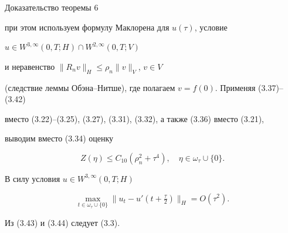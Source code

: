 \begin{pf*}{Доказательство теоремы 6}
\begin{equation}
\end{equation}


при этом используем формулу Маклорена для $u(\tau)$, условие


$u\in W^{3,\infty}(0,T;H)\cap W^{2,\infty}(0,T;V)$


и неравенство $\|R_nv\|_H\le\rho_n\|v\|_V$, $v\in V$


(следствие леммы Обэна--Нитше), где полагаем $v=f(0)$. Применяя (3.37)--(3.42)


вместо (3.22)--(3.25), (3.27), (3.31), (3.32), а также (3.36) вместо (3.21),


выводим вместо (3.34) оценку


\begin{equation}


Z(\eta)\le C_{10}(\rho_n^2+\tau^4),\quad


\eta\in\omega_{\tau}\cup\{0\}.


\end{equation}


В силу условия $u\in W^{3,\infty}(0,T;H)$


\begin{equation}


\max\limits_{t\in\omega_{\tau}\cup\{0\}}\|u_t-u'(t+\tfrac{\tau}2)\|_H


=O(\tau^2).


\end{equation}


Из (3.43) и (3.44) следует (3.3).


\end{pf*}





